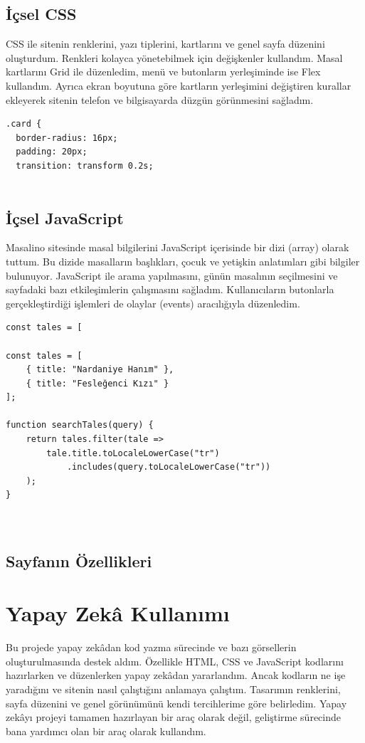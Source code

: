 \documentclass[12pt,a4paper]{article}
\begin{document}
\subsection{İçsel CSS}
CSS ile sitenin renklerini, yazı tiplerini, kartlarını ve genel sayfa düzenini oluşturdum. Renkleri kolayca yönetebilmek için değişkenler kullandım. Masal kartlarını Grid ile düzenledim, menü ve butonların yerleşiminde ise Flex kullandım. Ayrıca ekran boyutuna göre kartların yerleşimini değiştiren kurallar ekleyerek sitenin telefon ve bilgisayarda düzgün görünmesini sağladım.

\begin{lstlisting}[caption={İçsel CSS'ten önemli bir bölüm}]
  .card {
  border-radius: 16px;
  padding: 20px;
  transition: transform 0.2s;
 
\end{lstlisting}

\subsection{İçsel JavaScript}
Masalino sitesinde masal bilgilerini JavaScript içerisinde bir dizi (array) olarak tuttum. Bu dizide masalların başlıkları, çocuk ve yetişkin anlatımları gibi bilgiler bulunuyor. JavaScript ile arama yapılmasını, günün masalının seçilmesini ve sayfadaki bazı etkileşimlerin çalışmasını sağladım. Kullanıcıların butonlarla gerçekleştirdiği işlemleri de olaylar (events) aracılığıyla düzenledim.

\begin{lstlisting}[caption={İçsel JavaScript'ten önemli bir bölüm}]
 const tales = [
  
const tales = [
    { title: "Nardaniye Hanım" },
    { title: "Fesleğenci Kızı" }
];

function searchTales(query) {
    return tales.filter(tale =>
        tale.title.toLocaleLowerCase("tr")
            .includes(query.toLocaleLowerCase("tr"))
    );
}

  

\end{lstlisting}

\subsection{Sayfanın Özellikleri}


\section{Yapay Zekâ Kullanımı}
Bu projede yapay zekâdan kod yazma sürecinde ve bazı görsellerin oluşturulmasında destek aldım. Özellikle HTML, CSS ve JavaScript kodlarını hazırlarken ve düzenlerken yapay zekâdan yararlandım. Ancak kodların ne işe yaradığını ve sitenin nasıl çalıştığını anlamaya çalıştım. Tasarımın renklerini, sayfa düzenini ve genel görünümünü kendi tercihlerime göre belirledim. Yapay zekâyı projeyi tamamen hazırlayan bir araç olarak değil, geliştirme sürecinde bana yardımcı olan bir araç olarak kullandım.
\end{document}
